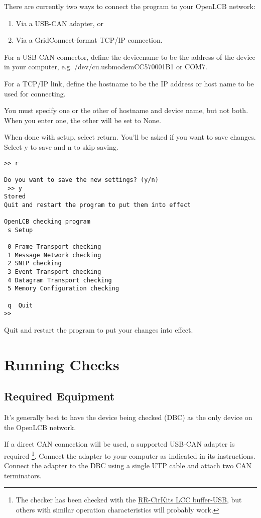 \documentclass[11pt]{article}
\begin{document}
There are currently two ways to connect the program to your OpenLCB network:
\begin{enumerate}
\item Via a USB-CAN adapter, or
\item Via a GridConnect-format TCP/IP connection.
\end{enumerate}

For a USB-CAN connector, define the devicename to be the address of the device in your computer, 
e.g. /dev/cu.usbmodemCC570001B1 or COM7.

For a TCP/IP link, define the hostname to be the IP address or host name to be used 
for connecting.

You must specify one or the other of hostname and device name, but not both.
When you enter one, the other will be set to None.

When done with setup, select return.  You'll be asked if you want to save changes.  
Select y to save and n to skip saving.

\begin{verbatim}
>> r

Do you want to save the new settings? (y/n)
 >> y
Stored
Quit and restart the program to put them into effect

OpenLCB checking program
 s Setup

 0 Frame Transport checking
 1 Message Network checking
 2 SNIP checking
 3 Event Transport checking
 4 Datagram Transport checking
 5 Memory Configuration checking
  
 q  Quit
>> 
\end{verbatim}

Quit and restart the program to put your changes into effect.

\section{Running Checks}

\subsection{Required Equipment}

It's generally best to have the device being checked (DBC) 
as the only device on the OpenLCB network. 

If a direct CAN connection will be used,
a supported USB-CAN adapter is required
\footnote{The checker has been checked with the
\href{https://www.rr-cirkits.com/description/LCC-usb-flyer.pdf}{RR-CirKits LCC buffer-USB},
but others with similar operation characteristics will probably work.
}. 
Connect the adapter to your computer as indicated in its instructions.
Connect the adapter to the DBC using a single UTP cable
and attach two CAN terminators.
\end{document}
